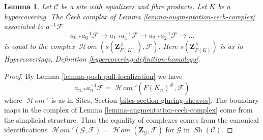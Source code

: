 \documentclass[10pt,a4paper]{amsart}
\theoremstyle{plain}
\newtheorem{lemma}[subsection]{Lemma}
\theoremstyle{definition}
\theoremstyle{remark}
\numberwithin{equation}{subsection}
\def\SheafHom{\mathop{\mathcal{H}\!\mathit{om}}\nolimits}
\def\Sh{\mathop{\mathit{Sh}}\nolimits}
\begin{document}
\begin{lemma}
\label{lemma-hypercovering-cech-complex}
Let $\mathcal{C}$ be a site with equalizers and fibre products.
Let $K$ be a hypercovering. The {\v C}ech complex
of Lemma \ref{lemma-augmentation-cech-complex} associated to
$a^{-1}\mathcal{F}$
$$
a_{0, *}a_0^{-1}\mathcal{F} \to a_{1, *}a_1^{-1}\mathcal{F} \to
a_{2, *}a_2^{-1}\mathcal{F} \to \ldots
$$
is equal to the complex $\SheafHom(s(\mathbf{Z}_{F(K)}^\#), \mathcal{F})$.
Here $s(\mathbf{Z}_{F(K)}^\#)$ is as in
Hypercoverings, Definition \ref{hypercovering-definition-homology}.
\end{lemma}

\begin{proof}
By Lemma \ref{lemma-push-pull-localization} we have
$$
a_{n, *}a_n^{-1}\mathcal{F} = \SheafHom'(F(K_n)^\#, \mathcal{F})
$$
where $\SheafHom'$ is as in Sites, Section \ref{sites-section-glueing-sheaves}.
The boundary maps in the complex of
Lemma \ref{lemma-augmentation-cech-complex}
come from the simplicial structure.
Thus the equality of complexes comes 
from the canonical identifications
$\SheafHom'(\mathcal{G}, \mathcal{F}) =
\SheafHom(\mathbf{Z}_\mathcal{G}, \mathcal{F})$ for
$\mathcal{G}$ in $\Sh(\mathcal{C})$.
\end{proof}
\end{document}
